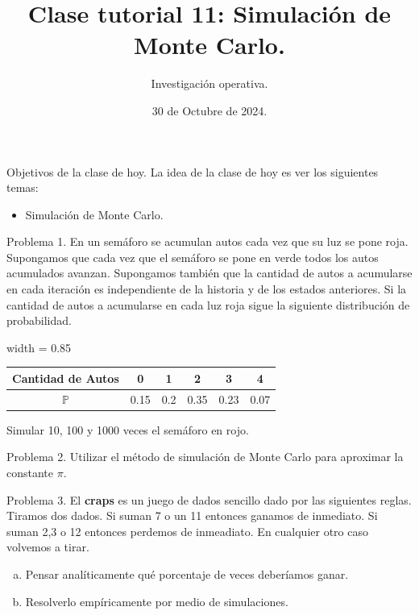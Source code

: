 \documentclass{beamer}
\title[]{Clase tutorial 11: Simulación de Monte Carlo.}
\date{30 de Octubre de 2024.}
\author[]{ Investigación operativa.}
\institute{Universidad de San Andrés}
\begin{document}
\maketitle

\begin{frame}{Objetivos de la clase de hoy.}
  La idea de la clase de hoy es ver los siguientes temas:
  \begin{itemize}
    \item Simulación de Monte Carlo.
  \end{itemize}
\end{frame}

\begin{frame}[fragile]{Problema 1.}
En un semáforo se acumulan autos cada vez que su luz se pone roja.
Supongamos que cada vez que el semáforo se pone en verde todos los autos
acumulados avanzan. 
Supongamos también que la cantidad de autos a acumularse en cada iteración es
independiente de la historia y de los estados anteriores.
Si la cantidad de autos a acumularse en cada luz roja sigue la siguiente distribución de probabilidad.
\begin{center}
  \begin{adjustbox}{width = 0.85 \textwidth}
      \begin{tabular}{|c|c|c|c|c|c|}
        \hline
        Cantidad de Autos & 0    & 1   & 2    & 3    & 4 \\
        \hline 
        $\mathbb{P}$      & 0.15 & 0.2 & 0.35 & 0.23 & 0.07 \\
        \hline 
      \end{tabular}
  \end{adjustbox}
\end{center}

Simular 10, 100 y 1000 veces el semáforo en rojo.

\end{frame}


\begin{frame}[fragile]{Problema 2.}
 Utilizar el método de simulación de Monte Carlo para aproximar la constante $\pi$.
\end{frame}

\begin{frame}[fragile]{Problema 3.}
  El \textbf{craps} es un juego de dados sencillo dado por las siguientes reglas.
  Tiramos dos dados.
  Si suman 7 o un 11 entonces ganamos de inmediato.
  Si suman 2,3 o 12 entonces perdemos de inmeadiato.
  En cualquier otro caso volvemos a tirar.

  \begin{enumerate}[a)]
    \item Pensar analíticamente qué porcentaje de veces deberíamos ganar.

    \item Resolverlo empíricamente por medio de simulaciones.
  \end{enumerate}
\end{frame}
\end{document}
